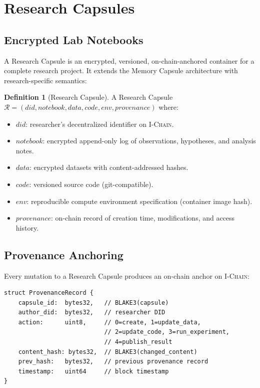 \documentclass[11pt,letterpaper]{article}
\theoremstyle{definition}
\newtheorem{definition}{Definition}
\theoremstyle{remark}
\newcommand{\IChain}{\textsc{I-Chain}}
\begin{document}
\section{Research Capsules}
\label{sec:capsules}

\subsection{Encrypted Lab Notebooks}

A Research Capsule is an encrypted, versioned, on-chain-anchored container for a complete research project. It extends the Memory Capsule architecture \cite{zoo-ai-memory} with research-specific semantics:

\begin{definition}[Research Capsule]
A Research Capsule $\mathcal{R} = (\textit{did}, \textit{notebook}, \textit{data}, \textit{code}, \textit{env}, \textit{provenance})$ where:
\begin{itemize}
    \item $\textit{did}$: researcher's decentralized identifier on \IChain{}.
    \item $\textit{notebook}$: encrypted append-only log of observations, hypotheses, and analysis notes.
    \item $\textit{data}$: encrypted datasets with content-addressed hashes.
    \item $\textit{code}$: versioned source code (git-compatible).
    \item $\textit{env}$: reproducible compute environment specification (container image hash).
    \item $\textit{provenance}$: on-chain record of creation time, modifications, and access history.
\end{itemize}
\end{definition}

\subsection{Provenance Anchoring}

Every mutation to a Research Capsule produces an on-chain anchor on \IChain{}:

\begin{verbatim}
struct ProvenanceRecord {
    capsule_id:  bytes32,   // BLAKE3(capsule)
    author_did:  bytes32,   // researcher DID
    action:      uint8,     // 0=create, 1=update_data,
                            // 2=update_code, 3=run_experiment,
                            // 4=publish_result
    content_hash: bytes32,  // BLAKE3(changed_content)
    prev_hash:   bytes32,   // previous provenance record
    timestamp:   uint64     // block timestamp
}
\end{verbatim}
\end{document}
